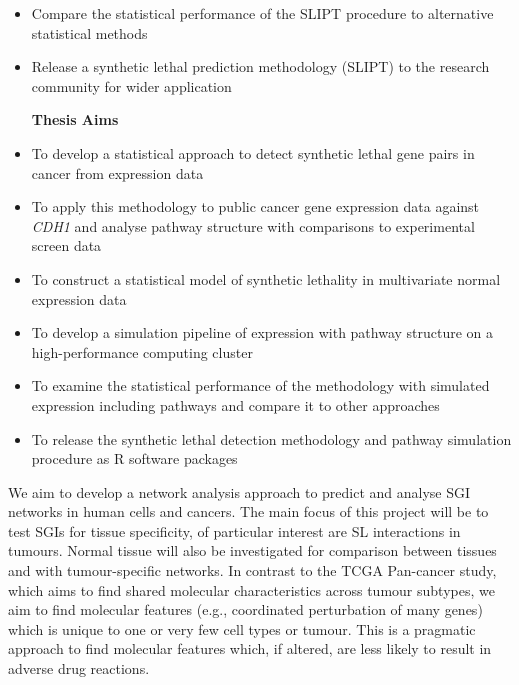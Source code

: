 \begin{itemize}
\item

Compare the statistical performance of the SLIPT procedure to alternative statistical methods

\item 

Release a synthetic lethal prediction methodology (SLIPT) to the research
community for wider application 

\clearpage

\begin{center}
 \textbf{Thesis Aims}
\end{center}


\end{itemize}


  \begin{itemize}
   \item To develop a statistical approach to detect synthetic lethal gene pairs in cancer from expression data

   \bigskip
   
   \item To apply this methodology to public cancer gene expression data against \textit{CDH1} and analyse pathway structure with comparisons to experimental screen data

   \bigskip
   
   \item To construct a statistical model of synthetic lethality in multivariate normal expression data
 
   \bigskip
   
   \item To develop a simulation pipeline of expression with pathway structure on a high-performance computing cluster 

   \bigskip
   
   \item To examine the statistical performance of the methodology with simulated expression including pathways and compare it to other approaches

   \bigskip
   
   \item To release the synthetic lethal detection methodology and pathway simulation procedure as R software packages
   
  \end{itemize}

  
\iffalse
We aim to develop a network analysis approach to predict and analyse SGI networks in human cells and cancers. The main focus of this project will be to test SGIs for tissue specificity, of particular interest are SL interactions in tumours. Normal tissue will also be investigated for comparison between tissues and with tumour-specific networks. In contrast to the TCGA Pan-cancer study, which aims to find shared molecular characteristics across tumour subtypes, we aim to find molecular features (e.g., coordinated perturbation of many genes) which is unique to one or very few cell types or tumour. This is a pragmatic approach to find molecular features which, if altered, are less likely to result in adverse drug reactions.

